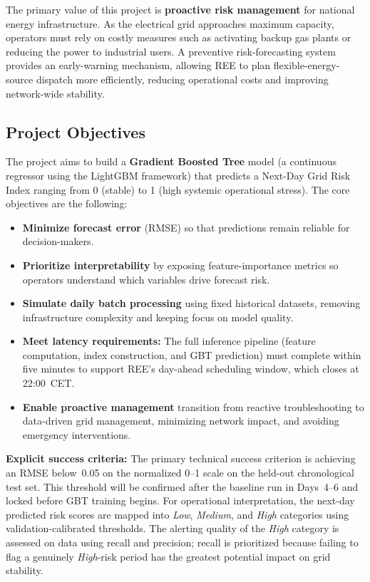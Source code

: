 \documentclass[11pt, a4paper]{article}
\begin{document}
The primary value of this project is \textbf{proactive risk management} for national energy infrastructure. As the electrical grid approaches maximum capacity, operators must rely on costly measures such as activating backup gas plants or reducing the power to industrial users. A preventive risk-forecasting system provides an early-warning mechanism, allowing REE to plan flexible-energy-source dispatch more efficiently, reducing operational costs and improving network-wide stability.

\subsection{Project Objectives}

The project aims to build a \textbf{Gradient Boosted Tree} model (a continuous regressor using the LightGBM framework) that predicts a Next-Day Grid Risk Index ranging from 0 (stable) to 1 (high systemic operational stress). The core objectives are the following:

\begin{itemize}
  \item \textbf{Minimize forecast error} (RMSE) so that predictions remain reliable for decision-makers.
  \item \textbf{Prioritize interpretability} by exposing feature-importance metrics so operators understand which variables drive forecast risk.
  \item \textbf{Simulate daily batch processing} using fixed historical datasets, removing infrastructure complexity and keeping focus on model quality.
  \item \textbf{Meet latency requirements:} The full inference pipeline
        (feature computation, index construction, and GBT prediction) must complete within five minutes to support REE's day-ahead scheduling window, which closes at 22:00~CET.
  \item \textbf{Enable proactive management} transition from reactive troubleshooting to data-driven grid management, minimizing network impact, and avoiding emergency interventions.
\end{itemize}

\textbf{Explicit success criteria:} The primary technical success criterion is achieving an RMSE below~0.05 on the normalized 0--1 scale on the held-out chronological test set. This threshold will be confirmed after the baseline run in Days~4--6 and locked before GBT training begins. For operational interpretation, the next-day predicted risk scores are mapped into \textit{Low}, \textit{Medium}, and \textit{High} categories using validation-calibrated thresholds. The alerting quality of the \textit{High} category is assessed on data using recall and precision; recall is prioritized because failing to flag a genuinely \textit{High}-risk period has the greatest potential impact on grid stability. 
\end{document}
